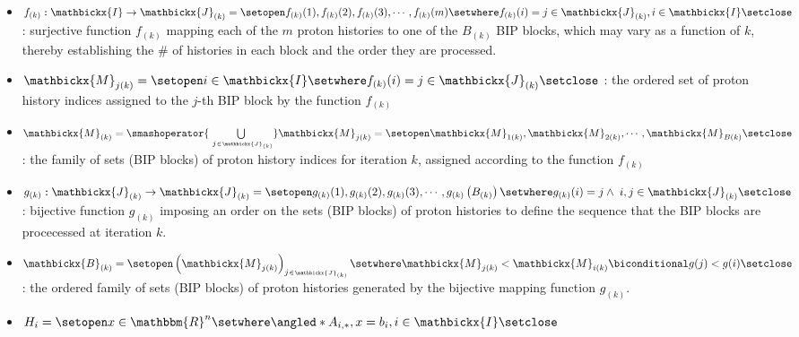 \begin{tcbenvironment}
\begin{tcbparbox}
\begin{itemize}
        \item $f_{(k)}\,\texttt{:}\,\mathbickx{I}\to\mathbickx{J}_{(k)}%
            =\setopen f_{(k)}(1),f_{(k)}(2),f_{(k)}(3),\cdots,f_{(k)}(m)\setwhere f_{(k)}(i)=j\in\mathbickx{J}_{(k)}, i\in\mathbickx{I}\setclose $
             : surjective function $f_{(k)}$ mapping each of the $m$ proton histories to one of the $B_{(k)}$ BIP blocks, which may vary as a function of $k$, thereby establishing the \# of histories in each block and the order they are processed.
        \item $\mathbickx{M}_{j(k)}%
            =\setopen i\in\mathbickx{I}\setwhere f_{(k)}(i)=j\in\mathbickx{J}_{(k)}%
            \setclose$ %
            : the ordered set of proton history indices assigned to the $j$-th BIP block by the function $f_{(k)}$
        \item $\mathbickx{M}_{(k)}%
            =\smashoperator{\bigcup\limits_{\kern3ptj\scriptscriptstyle\kern0.5pt\in\kern0.5pt\mathbickx{J}_{(k)}}}\mathbickx{M}_{j(k)}%
            =\setopen\mathbickx{M}_{1(k)}, \mathbickx{M}_{2(k)}, \cdots, \mathbickx{M}_{B(k)}\setclose$ %
            : the family of sets (BIP blocks) of proton history indices for iteration $k$, assigned according to the function $f_{(k)}$
        \item $g_{(k)}\,\texttt{:}\,\mathbickx{J}_{(k)}\to\mathbickx{J}_{(k)}%
            =\setopen g_{(k)}(1),g_{(k)}(2),g_{(k)}(3),\cdots,g_{(k)}\left(B_{(k)}\right)\setwhere g_{(k)}(i)=j \land \;i,j\in\mathbickx{J}_{(k)}\setclose $
             : bijective function $g_{(k)}$ imposing an order on the sets (BIP blocks) of proton histories to define the sequence that the BIP blocks are procecessed at iteration $k$.
        \item $\mathbickx{B}_{(k)}%
            =\setopen\left(\mathbickx{M}_{j(k)}\right)_{j\kern0.5pt\scriptscriptstyle\in\kern0.5pt\mathbickx{J}_{(k)}}\setwhere \mathbickx{M}_{j(k)}<\mathbickx{M}_{i(k)}  \biconditional g(j)<g(i)\setclose$ %
             : the ordered family of sets (BIP blocks) of proton histories generated by the bijective mapping function $g_{(k)}$.
        \item $H_i=\setopen x\in\mathbbm{R}^n \setwhere \angled*{A_{i, *}, x} = b_i, i\in\mathbickx{I}\setclose$ %

\end{itemize}
\end{tcbparbox}
\end{tcbenvironment}
